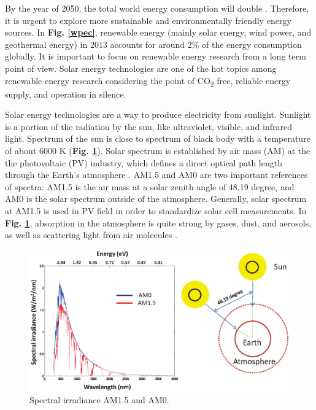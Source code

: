 \documentclass[a4paper, 12pt, titlepage,oneside,drop]{kthesis}
\begin{document}
By the year of 2050, the total world energy consumption will double \cite{iea}. Therefore, it is urgent to explore more sustainable and environmentally friendly energy sources. In \textbf{Fig. \ref{wpec}},
renewable energy (mainly solar energy, wind power, and geothermal energy) in 2013 accounts for around 2\% of the energy consumption globally. It is important to focus on renewable energy research from a 
long term point of view. Solar energy technologies are one of the hot topics among renewable energy research considering the point of CO\textsubscript{2} free, reliable energy supply, and operation in silence.

Solar energy technologies are a way to produce electricity from sunlight. Sunlight is a portion of the radiation by the sun, like ultraviolet, visible,
and infrared light. Spectrum of the sun is close to spectrum of black body with a temperature of about 6000 K (\textbf{Fig. \ref{spectrumsun}}). Solar spectrum is established
by air mass (AM) at the the photovoltaic (PV) industry, which defines a direct optical path length through the Earth's atmosphere \cite{smestad2002optoelectronics}. AM1.5 and AM0 are two important references of spectra:
AM1.5 is the air mass at a solar zenith angle of 48.19 degree, and AM0 is the solar spectrum outside of the atmosphere. Generally, solar spectrum at AM1.5 is used in PV field in order to standardize solar cell measurements. 
In \textbf{Fig. \ref{spectrumsun}}, absorption in the atmosphere is quite strong by gases, dust, and aerosols, as well as scattering light from air molecules \cite{seinfeld2012atmospheric}.

\begin{figure}[H]
\centering
\includegraphics[scale=0.6]{spectrum.eps}
\caption{Spectral irradiance AM1.5 and AM0.}
\label{spectrumsun}
\end{figure}
\end{document}
